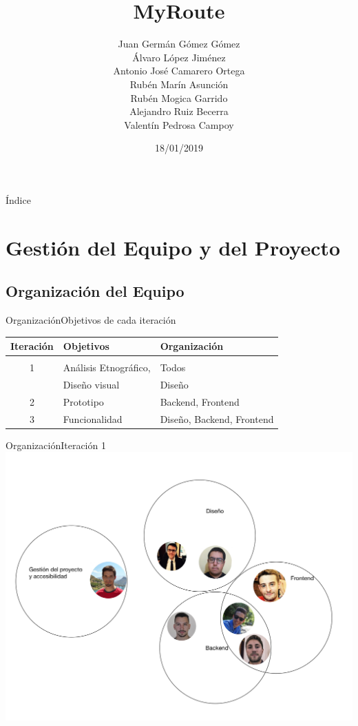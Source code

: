 \documentclass{beamer}
\title{MyRoute}
\author[GARVAM]{Juan Germ\'an G\'omez G\'omez \\ \'Alvaro L\'opez Jim\'enez \\ Antonio Jos\'e Camarero Ortega \\ Rub\'en Mar\'in Asunci\'on \\ Rub\'en Mogica Garrido \\ Alejandro Ruiz Becerra \\ Valent\'in Pedrosa Campoy}
\date{18/01/2019}
\begin{document}
\begin{frame}
  \titlepage 
\end{frame}

\begin{frame}{\'Indice}
  \tiny 
  \tableofcontents
\end{frame}

\section{Gesti\'on del Equipo y del Proyecto}

\subsection{Organizaci\'on del Equipo}

\begin{frame}{Organizaci\'on}{Objetivos de cada iteraci\'on}
  \begin{tabular}{cll}
  Iteraci\'on  & Objetivos & Organizaci\'on \\\hline \\
  1  &  An\'alisis Etnogr\'afico,  & Todos \\
     &  Dise\~no visual            & Dise\~no\\[0.3cm]
  2  &  Prototipo  & Backend, Frontend \\[0.3cm]
  3  &  Funcionalidad & Dise\~no, Backend, Frontend
  \end{tabular}
\end{frame}


\begin{frame}{Organizaci\'on}{Iteraci\'on 1}
\includegraphics[scale=0.1]{images_latex/org_itr1}
\end{frame}
\end{document}
